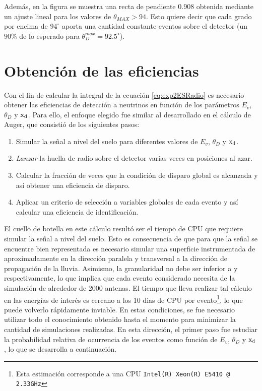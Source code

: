 	Adem\'as, en la figura se muestra una recta de pendiente 0.908 obtenida mediante un ajuste lineal para los valores de $\theta_{MAX}>94$.
	Esto quiere decir que cada grado por encima de $94^\circ$ aporta una cantidad constante eventos sobre el detector (un $90\%$ de lo esperado para $\theta_D^{max}=92.5^\circ$).
	
\section{Obtenci\'on de las eficiencias}
\label{sc:effRadio}

Con el fin de calcular la integral de la ecuaci\'on \ref{eq:exp2ESRadio} es necesario obtener las eficiencias de detecci\'on a neutrinos en funci\'on de los par\'ametros $E_v$, $\theta_D$ y ${\rm x_d}$. 
Para ello, el enfoque elegido fue similar al desarrollado en el c\'alculo de Auger, que consisti\'o de los siguientes pasos:
%
\begin{enumerate}
	\item Simular la se\~nal a nivel del suelo para diferentes valores de $E_v$, $\theta_D$ y ${\rm x_d}$.
	\item \emph{Lanzar} la huella de radio sobre el detector varias veces en posiciones al azar.
	\item Calcular la fracci\'on de veces que la condici\'on de disparo global es alcanzada y as\'i obtener una eficiencia de disparo.
	\item Aplicar un criterio de selecci\'on a variables globales de cada evento y as\'i calcular una eficiencia de identificaci\'on.
\end{enumerate}
%

El cuello de botella en este c\'alculo result\'o ser el tiempo de CPU que requiere simular la se\~nal a nivel del suelo.
Esto es consecuencia de que para que la se\~nal se encuentre bien representada es necesario simular una superficie instrumentada de aproximadamente  en la direcci\'on paralela y transversal a la direcci\'on de propagaci\'on de la lluvia.
Asimismo, la granularidad no debe ser inferior a  y  respectivamente, lo que implica que cada evento considerado necesita de la simulaci\'on de alrededor de 2000 antenas.
El tiempo que lleva realizar tal c\'alculo en las energ\'ias de inter\'es es cercano a los 10 dias de CPU por evento\footnote{Esta estimaci\'on corresponde a una CPU \texttt{Intel(R) Xeon(R) E5410 @ 2.33GHz}}, lo que puede volverlo r\'apidamente inviable.
En estas condiciones, se fue necesario utilizar todo el conocimiento obtenido hasta el momento para minimizar la cantidad de simulaciones realizadas.
En esta direcci\'on, el primer paso fue estudiar la probabilidad relativa de ocurrencia de los eventos como funci\'on de $E_v$, $\theta_D$ y ${\rm x_d}$, lo que se desarrolla a continuaci\'on.
	
